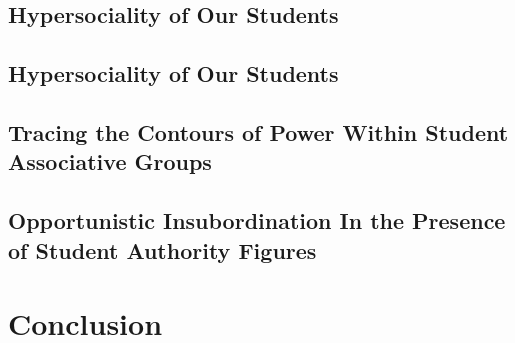 \documentclass[12pt]{article}
\begin{document}
	\subsection{Hypersociality of Our Students}
	\subsection{Hypersociality of Our Students}
	\subsection{Tracing the Contours of Power Within Student Associative Groups}
	\subsection{Opportunistic Insubordination In the Presence of Student Authority Figures}
	
	\section{Conclusion}
	
	\pagebreak
	
\end{document}
